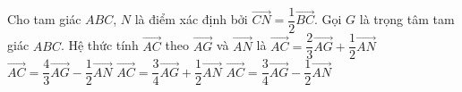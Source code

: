 \begin{ex}%
	Cho tam giác $ABC$, $N$ là điểm xác định bởi $ \overrightarrow{CN}= \dfrac{1}{2} \overrightarrow{BC}$. Gọi $G$ là trọng tâm tam giác $ABC$. Hệ thức tính $ \overrightarrow{AC}$ theo $ \overrightarrow{AG}$ và $ \overrightarrow{AN}$ là
	\choice
	{$ \overrightarrow{AC}= \dfrac{2}{3}\overrightarrow{AG}+ \dfrac{1}{2}\overrightarrow{AN}$}
	{$ \overrightarrow{AC}= \dfrac{4}{3}\overrightarrow{AG}- \dfrac{1}{2}\overrightarrow{AN}$}
	{\True $ \overrightarrow{AC}= \dfrac{3}{4}\overrightarrow{AG}+ \dfrac{1}{2}\overrightarrow{AN}$}
	{$ \overrightarrow{AC}= \dfrac{3}{4}\overrightarrow{AG}- \dfrac{1}{2}\overrightarrow{AN}$}
\end{ex}







